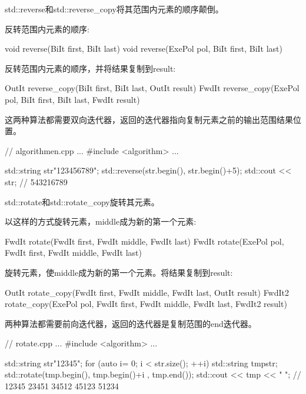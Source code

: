 
std::reverse和std::reverse\_copy将其范围内元素的顺序颠倒。

反转范围内元素的顺序:

\begin{cpp}
void reverse(BiIt first, BiIt last)
void reverse(ExePol pol, BiIt first, BiIt last)
\end{cpp}

反转范围内元素的顺序，并将结果复制到result:

\begin{cpp}
OutIt reverse_copy(BiIt first, BiIt last, OutIt result)
FwdIt reverse_copy(ExePol pol, BiIt first, BiIt last, FwdIt result)
\end{cpp}

这两种算法都需要双向迭代器，返回的迭代器指向复制元素之前的输出范围结果位置。


\begin{cpp}
// algorithmen.cpp
...
#include <algorithm>
...

std::string str{"123456789"};
std::reverse(str.begin(), str.begin()+5);
std::cout << str; // 543216789
\end{cpp}


std::rotate和std::rotate\_copy旋转其元素。

以这样的方式旋转元素，middle成为新的第一个元素:

\begin{cpp}
FwdIt rotate(FwdIt first, FwdIt middle, FwdIt last)
FwdIt rotate(ExePol pol, FwdIt first, FwdIt middle, FwdIt last)
\end{cpp}

旋转元素，使middle成为新的第一个元素。将结果复制到result:

\begin{cpp}
OutIt rotate_copy(FwdIt first, FwdIt middle, FwdIt last, OutIt result)
FwdIt2 rotate_copy(ExePol pol, FwdIt first, FwdIt middle, FwdIt last,
				   FwdIt2 result)
\end{cpp}

两种算法都需要前向迭代器，返回的迭代器是复制范围的end迭代器。


\begin{cpp}
// rotate.cpp
...
#include <algorithm>
...

std::string str{"12345"};
for (auto i= 0; i < str.size(); ++i){
	std::string tmp{str};
	std::rotate(tmp.begin(), tmp.begin()+i , tmp.end());
	std::cout << tmp << " ";
} // 12345 23451 34512 45123 51234
\end{cpp}

